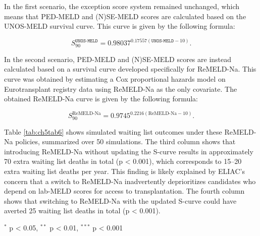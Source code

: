 \documentclass[11pt,twoside,]{book}
\begin{document}
In the first scenario, the exception score system remained unchanged,
which means that PED-MELD and (N)SE-MELD scores are calculated based on
the UNOS-MELD survival curve. This curve is given by the following
formula:

\[
S_{90}^{\texttt{UNOS-MELD}} = 0.98037^{0.17557(\texttt{UNOS-MELD} - 10)}.
\]

In the second scenario, PED-MELD and (N)SE-MELD scores are instead
calculated based on a survival curve developed specifically for
ReMELD-Na. This curve was obtained by estimating a Cox proportional hazards
model on Eurotransplant registry data using ReMELD-Na as the only covariate.
The obtained ReMELD-Na curve is given by the following formula:

\[
S_{90}^{\text{ReMELD-Na}} = 0.9745^{0.2216(\text{ReMELD-Na} - 10)}.
\]

\newpage
Table \ref{tab:ch5tab6} shows simulated waiting list outcomes under
these ReMELD-Na policies, summarized over 50 simulations. The
third column shows that introducing ReMELD-Na without updating the
S-curve results in approximately 70 extra waiting list deaths in total
(p \textless{} 0.001), which corresponds to 15--20 extra waiting list deaths per
year. This finding is likely explained by ELIAC's concern that a switch
to ReMELD-Na inadvertently deprioritizes candidates who depend on
lab-MELD scores for access to transplantation. The fourth column shows
that switching to ReMELD-Na with the updated S-curve could have averted
25 waiting list deaths in total (p \textless{} 0.001).

\begin{table}[h]
\caption{Average number of simulated waiting list exits for candidates under UNOS-MELD and ReMELD-Na, with and without updating the S-curve. The numbers in brackets are 95\% interquantile ranges, observed over 50 simulations of ELAS between January 1, 2016, and January 1. Paired t-tests were used to test whether either scenario significantly affected the simulated waiting list outcomes.}
\label{tab:ch5tab6}
\centering
{}
\parbox{\textwidth}{\footnotesize \smallskip $^{*}$ p < 0.05, $^{**}$ p < 0.01, $^{***}$ p < 0.001}
\end{table}
\end{document}
